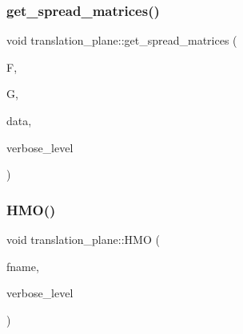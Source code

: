 \subsubsection{\texorpdfstring{get\+\_\+spread\+\_\+matrices()}{get\_spread\_matrices()}}
{\footnotesize\ttfamily void translation\+\_\+plane\+::get\+\_\+spread\+\_\+matrices (\begin{DoxyParamCaption}\item[{\mbox{\hyperlink{galois_8h_a09fddde158a3a20bd2dcadb609de11dc}{I\+NT}} $\ast$}]{F,  }\item[{\mbox{\hyperlink{galois_8h_a09fddde158a3a20bd2dcadb609de11dc}{I\+NT}} $\ast$}]{G,  }\item[{\mbox{\hyperlink{galois_8h_a09fddde158a3a20bd2dcadb609de11dc}{I\+NT}} $\ast$}]{data,  }\item[{\mbox{\hyperlink{galois_8h_a09fddde158a3a20bd2dcadb609de11dc}{I\+NT}}}]{verbose\+\_\+level }\end{DoxyParamCaption})}

\mbox{\label{classtranslation__plane_a6c47671a9c7d6829dcecaaa86dfcbe04}} 
\subsubsection{\texorpdfstring{H\+M\+O()}{HMO()}}
{\footnotesize\ttfamily void translation\+\_\+plane\+::\+H\+MO (\begin{DoxyParamCaption}\item[{const \mbox{\hyperlink{galois_8h_ab6cc7b4aeb6ea31aba2b3fbfc83ff5e6}{B\+Y\+TE}} $\ast$}]{fname,  }\item[{\mbox{\hyperlink{galois_8h_a09fddde158a3a20bd2dcadb609de11dc}{I\+NT}}}]{verbose\+\_\+level }\end{DoxyParamCaption})}

\mbox{\label{classtranslation__plane_a7a3382d4458a09f7ff1fc1ac257ee6fb}} 
